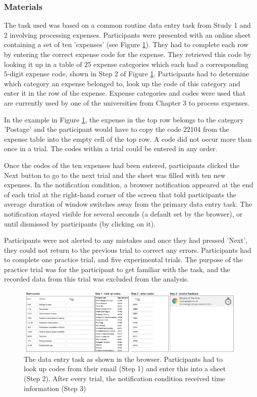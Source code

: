 \subsubsection{Materials}
The task used was based on a common routine data entry task from Study 1 and 2 involving processing expenses. Participants were presented with an online sheet containing a set of ten 'expenses' (see Figure \ref{fig:ch56-6_TaskInterface}). They had to complete each row by entering the correct expense code for the expense. They retrieved this code by looking it up in a table of 25 expense categories which each had a corresponding 5-digit expense code, shown in Step 2 of Figure \ref{fig:ch56-6_TaskInterface}. Participants had to determine which category an expense belonged to, look up the code of this category and enter it in the row of the expense.  Expense categories and codes were used that are currently used by one of the  universities from Chapter 3 to process expenses.

In the example in Figure \ref{fig:ch56-6_TaskInterface}, the expense in the top row belongs to the category 'Postage' and the participant would have to copy the code 22104 from the expense table into the empty cell of the top row. A code did not occur more than once in a trial. The codes within a trial could be entered in any order. 

Once the codes of the ten expenses had been entered, participants clicked the Next button to go to the next trial and the sheet was filled with ten new expenses. In the notification condition, a browser notification appeared at the end of each trial at the right-hand corner of the screen that told participants the average duration of window switches away from the primary data entry task. The notification stayed visible for several seconds (a default set by the browser), or until dismissed by participants (by clicking on it). 

Participants were not alerted to any mistakes and once they had pressed 'Next', they could not return to the previous trial to correct any errors. Participants had to complete one practice trial, and five experimental trials. The purpose of the practice trial was for the participant to get familiar with the task, and the recorded data from this trial was excluded from the analysis.

\begin{figure}
\centering
\includegraphics[width=\textwidth]{images/ch56/ch56-6_taskinterface.pdf}
\caption[Study 6 data entry task layout]{The data entry task as shown in the browser. Participants had to look up codes from their email (Step 1) and enter this into a sheet (Step 2). After every trial, the notification condition received time information (Step 3)}
\label{fig:ch56-6_TaskInterface}
\end{figure}

